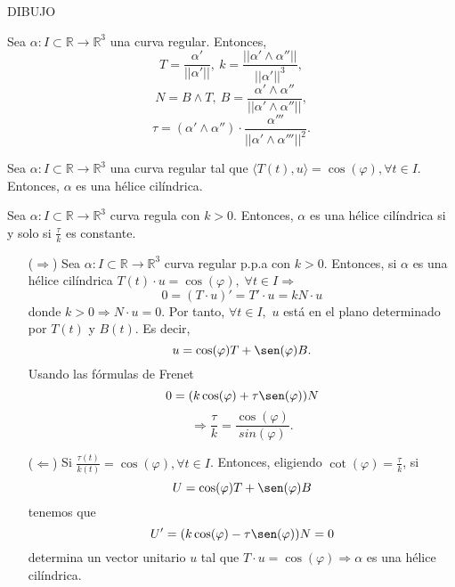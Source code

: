 DIBUJO

\begin{theo}
  Sea $\alpha  : I \subset \mathbb{R} \to \mathbb{R}^{3}$ una curva regular. Entonces,
  \[ 
    T = \frac{\alpha'}{||\alpha'||}, \ k = \frac{||\alpha' \wedge \alpha''||}{||\alpha'||^{3}},
  \] 
  \[ 
    N = B \wedge T , \ B = \frac{\alpha' \wedge \alpha''}{||\alpha' \wedge \alpha''||},
  \] 
  \[ 
    \tau = (\alpha' \wedge \alpha'') \cdot \frac{\alpha'''}{||\alpha' \wedge \alpha'''||^{2}} .
  \] 
\end{theo}

\begin{defn}
  Sea $\alpha  : I \subset \mathbb{R} \to \mathbb{R}^{3}$ una curva regular tal que $\langle T(t){ , }u \rangle = \cos(\varphi), \forall t \in I$. Entonces, $\alpha$ es una hélice cilíndrica.
\end{defn}

\begin{theo}
  Sea $\alpha  : I \subset \mathbb{R} \to \mathbb{R}^{3}$ curva regula con $k>0$. Entonces, $\alpha$ es una hélice cilíndrica si y solo si $\frac{\tau}{k}$ es constante.
\end{theo}

\begin{dem}
  \begin{enumerate}[label=(\roman*)]
    \item []
    \item [($\Rightarrow$)] Sea $\alpha  : I \subset \mathbb{R} \to \mathbb{R}^{3}$ curva regular p.p.a con $k>0$. Entonces, si $\alpha$ es una hélice cilíndrica $T(t) \cdot u = \cos(\varphi), \; \forall t \in I \Rightarrow$
      \[ 
        0 = (T \cdot u)' = T' \cdot u = kN \cdot u
      \] 
      donde $k>0 \Rightarrow N \cdot u = 0$. Por tanto, $\forall t \in I,$ $u$ está en el plano determinado por $T(t)$ y $B(t)$. Es decir,
      \[ 
        u = \cos(\varphi)T + \sen(\varphi)B .
      \] 
      Usando las fórmulas de Frenet
      \[ 
        0 = (k \cos(\varphi) + \tau \sen(\varphi))N 
      \] 
      \[ 
        \Rightarrow \frac{\tau}{k} = \frac{\cos(\varphi)}{sin(\varphi)}.
      \] 
    \item [($\Leftarrow$)] Si $\frac{\tau(t)}{k(t)} = \cos(\varphi), \forall t \in I$. Entonces, eligiendo $\cot(\varphi) = \frac{\tau}{k}$, si
      \[ 
        U = \cos(\varphi)T + \sen(\varphi)B 
      \] 
      tenemos que
      \[ 
        U' = (k \cos(\varphi) - \tau \sen(\varphi))N = 0 
      \] 
      determina un vector unitario $u$ tal que $T \cdot u = \cos(\varphi) \Rightarrow \alpha$ es una hélice cilíndrica.
  \end{enumerate}
\end{dem}

